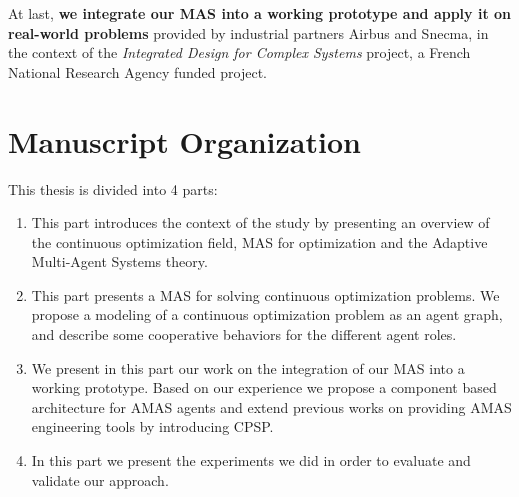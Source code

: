 At last, \textbf{we integrate our MAS into a working prototype and apply it on real-world problems} provided by industrial partners Airbus and Snecma, in the context of the \emph{Integrated Design for Complex Systems} project, a French National Research Agency funded project.

\pagebreak
\section*{Manuscript Organization}
This thesis is divided into 4 parts:
\begin{enumerate}[P{a}rt I.] %
\item This part introduces the context of the study by presenting an overview of the continuous optimization field, MAS for optimization and the Adaptive Multi-Agent Systems theory.
\item This part presents a MAS for solving continuous optimization problems. We propose a modeling of a continuous optimization problem as an agent graph, and describe some cooperative behaviors for the different agent roles.
\item We present in this part our work on the integration of our MAS into a working prototype. Based on our experience we propose a component based architecture for AMAS agents and extend previous works on providing AMAS engineering tools by introducing CPSP.
\item In this part we present the experiments we did in order to evaluate and validate our approach.
\end{enumerate}
